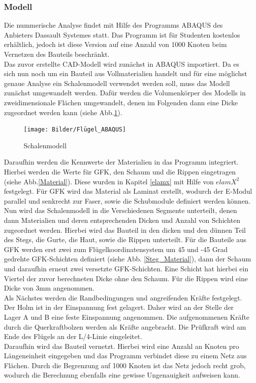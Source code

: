 
\subsubsection{Modell}
Die nummerische Analyse findet mit Hilfe des Programms ABAQUS des Anbieters Dassault Systemes statt. Das Programm ist für Studenten kostenlos erhältlich, jedoch ist diese Version auf eine Anzahl von 1000 Knoten beim Vernetzen des Bauteils beschränkt.\\
Das zuvor erstellte CAD-Modell wird zunächst in ABAQUS importiert. Da es sich nun noch um ein Bauteil aus Vollmaterialien handelt und für eine möglichst genaue Analyse ein Schalenmodell verwendet werden soll, muss das Modell zunächst umgewandelt werden. Dafür werden die Volumenkörper des Modells in zweidimensionale Flächen umgewandelt, denen im Folgenden dann eine Dicke zugeordnet werden kann (siehe Abb.\ref{Schalenmodell}).

\begin{figure}[h]
 \centering
 \texttt{[image: Bilder/Flügel\_ABAQUS]}
 \caption{Schalenmodell}
 \label{Schalenmodell}
\end{figure}
\noindent
Daraufhin werden die Kennwerte der Materialien in das Programm integriert. Hierbei werden die Werte für GFK, den Schaum und die Rippen eingetragen (siehe Abb.\ref{Material}). Diese wurden in Kapitel \ref{elamx} mit Hilfe von $elamX^{2}$ festgelegt. Für GFK wird das Material als Laminat erstellt, wodurch der E-Modul parallel und senkrecht zur Faser, sowie die Schubmodule definiert werden können.\\
\noindent
Nun wird das Schalenmodell in die Verschiedenen Segmente unterteilt, denen dann Materialien und deren entsprechenden Dicken und Anzahl von Schichten zugeordnet werden. Hierbei wird das Bauteil in den dicken und den dünnen Teil des Stegs, die Gurte, die Haut, sowie die Rippen unterteilt. Für die Bauteile aus GFK werden erst zwei zum Flügelkoordinatensystem um 45 und -45 Grad gedrehte GFK-Schichten definiert (siehe Abb. \ref{Steg_Material}), dann der Schaum und daraufhin erneut zwei versetzte GFK-Schichten. Eine Schicht hat hierbei ein Viertel der zuvor berechneten Dicke ohne den Schaum. Für die Rippen wird eine Dicke von 3mm angenommen.\\
\noindent
Als Nächstes werden die Randbedingungen und angreifenden Kräfte festgelegt. Der Holm ist in der Einspannung fest gelagert. Daher wird an der Stelle der Lager A und B eine feste Einspannung angenommen. Die aufgenommenen Kräfte durch die Querkraftbolzen werden als Kräfte angebracht. Die Prüfkraft wird am Ende des Flügels an der L/4-Linie eingeleitet.\\
Daraufhin wird das Bauteil vernetzt. Hierbei wird eine Anzahl an Knoten pro Längeneinheit eingegeben und das Programm verbindet diese zu einem Netz aus Flächen. Durch die Begrenzung auf 1000 Knoten ist das Netz jedoch recht grob, wodurch die Berechnung ebenfalls eine gewisse Ungenauigkeit aufweisen kann. \\
\newpage
